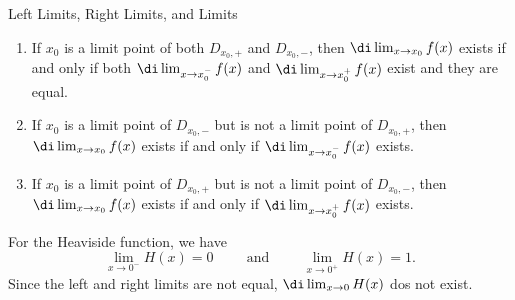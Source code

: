 \begin{highlight}{Left Limits, Right Limits, and Limits}
\begin{enumerate}[1.]
\item If $x_0$ is a limit point of both $D_{x_0,+}$ and $D_{x_0,-}$, then $\di\lim_{x\rightarrow x_0}f(x)$ exists if and only if both $\di\lim_{x\rightarrow x_0^-}f(x)$ and $\di\lim_{x\rightarrow x_0^+}f(x)$ exist and they are equal. 
\item 
If $x_0$ is a limit point of $D_{x_0,-}$ but is not a limit point of $D_{x_0,+}$, then  $\di\lim_{x\rightarrow x_0}f(x)$ exists if and only if   $\di\lim_{x\rightarrow x_0^-}f(x)$ exists.
\item 
If $x_0$ is a limit point of $D_{x_0,+}$ but is not a limit point of $D_{x_0,-}$, then  $\di\lim_{x\rightarrow x_0}f(x)$ exists if and only if   $\di\lim_{x\rightarrow x_0^+}f(x)$ exists.
\end{enumerate}\end{highlight}
\begin{example}{}
For the Heaviside function, we have
  \[\lim_{x\rightarrow 0^-}H(x)=0\hspace{1cm}\text{and}\hspace{1cm}\lim_{x\rightarrow 0^+}H(x)=1.\]Since the left and right limits are not equal, $\di \lim_{x\to 0}H(x)$ dos not exist.\end{example}
  


